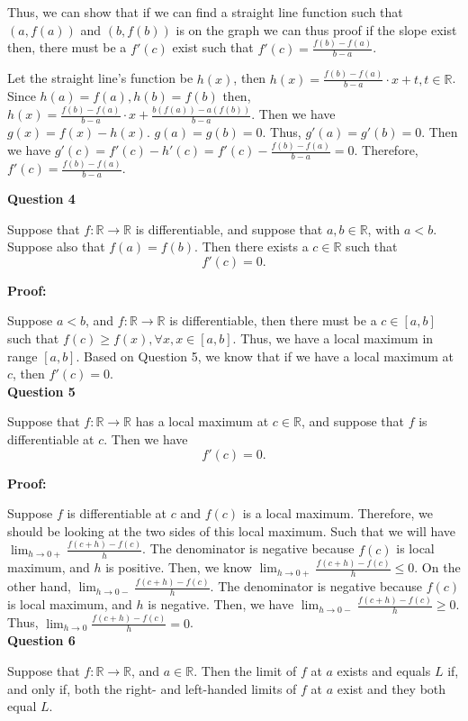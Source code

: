 \documentclass[a4paper,12pt]{report}
\newcommand{\R}{\mathbb{R}}
\begin{document}
\noindent
Thus, we can show that if we can find a straight line function such that $(a,f(a))$ and $(b,f(b))$ is on the graph we can thus proof if the slope exist then, there must be a $f'(c)$ exist such that $f'(c)=\frac{f(b)-f(a)}{b-a}$.

\noindent
Let the straight line's function be $h(x)$, then $h(x)=\frac{f(b)-f(a)}{b-a}\cdot{x}+t, t\in \mathbb{R}$. Since $h(a)=f(a),h(b)=f(b)$ then, $h(x)=\frac{f(b)-f(a)}{b-a}\cdot{x}+\frac{b(f(a))-a(f(b))}{b-a}$. Then we have $g(x)=f(x)-h(x)$. $g(a)=g(b)=0$. Thus, $g'(a)=g'(b)=0$. Then we have $g'(c)=f'(c)-h'(c)=f'(c)-\frac{f(b)-f(a)}{b-a}=0$. Therefore,$f'(c)=\frac{f(b)-f(a)}{b-a}$. 

\pagebreak
\noindent
\textbf{Question 4}

\noindent
Suppose that $f:\R\to\R$ is
differentiable, and suppose that $a,b\in\R$, 
with $a<b$. Suppose also 
that $f(a)=f(b)$. Then there exists a $c\in\R$
such that
\[
f'(c)=0.
\]

\noindent
\textbf{Proof: }

\noindent
Suppose $a<b$, and $f:\R\to\R$ is differentiable, then there must be a $c\in [a,b]$ such that $f(c)\geq f(x),\forall x, x\in [a,b]$. Thus, we have a local maximum in range $[a,b]$. Based on Question 5, we know that if we have a local maximum at $c$, then $f'(c)=0$.\\

\noindent
\textbf{Question 5}

\noindent
Suppose that $f:\R\to\R$
has a local maximum at $c\in\R$, and suppose 
that $f$ is differentiable at $c$. Then
we have
\[
f'(c)=0.
\]

\noindent
\textbf{Proof: }

\noindent
Suppose $f$ is differentiable at $c$ and $f(c)$ is a local maximum. Therefore, we should be looking at the two sides of this local maximum. Such that we will have $\displaystyle{\lim_{h\to 0+}}\frac{f(c+h)-f(c)}{h}$. The denominator is negative because $f(c)$ is local maximum, and $h$ is positive. Then, we know $\displaystyle{\lim_{h\to 0+}}\frac{f(c+h)-f(c)}{h}\leq 0$. On the other hand, $\displaystyle{\lim_{h\to 0-}}\frac{f(c+h)-f(c)}{h}$. The denominator is negative because $f(c)$ is local maximum, and $h$ is negative. Then, we have $\displaystyle{\lim_{h\to 0-}}\frac{f(c+h)-f(c)}{h}\geq 0$. Thus, $\displaystyle{\lim_{h\to 0}}\frac{f(c+h)-f(c)}{h} = 0$. \\

\noindent
\textbf{Question 6}

\noindent
Suppose that $f:\R\to\R$,
and $a\in\R$. Then the limit of $f$ at $a$ exists
and equals $L$ if, and only if, both the 
right- and left-handed limits of $f$ at $a$ 
exist and they both equal $L$.
\end{document}
